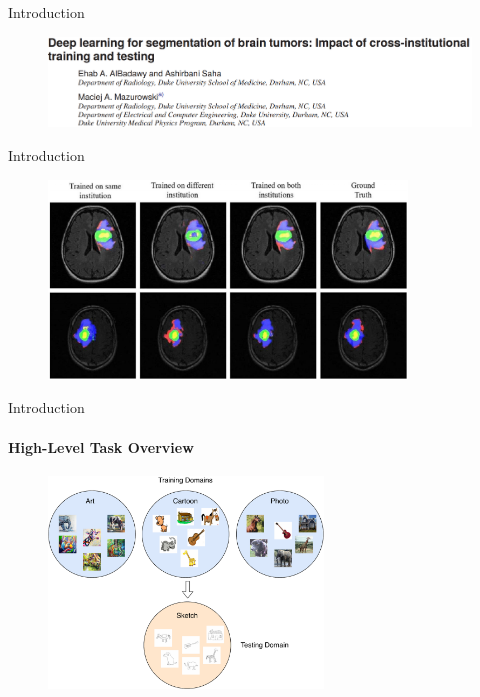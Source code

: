\documentclass[10pt,usepdftitle=false,aspectratio=169]{beamer}
\begin{document}



\begin{frame}{Introduction}
\begin{figure}
    \centering
    \includegraphics[width=\textwidth]{fig/medical.PNG}
\end{figure}
\end{frame}

\begin{frame}{Introduction}
\begin{figure}
    \centering
    \includegraphics[width=0.85\textwidth]{fig/tumor.PNG}
\end{figure}
\end{frame}

\begin{frame}{Introduction}
\framesubtitle{High-Level Task Overview}
\begin{figure}
    \centering
    \includegraphics[width=0.65\textwidth]{fig/DG.pdf}
\end{figure}
\end{frame}
\end{document}
